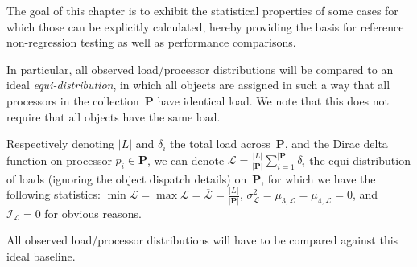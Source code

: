 The goal of this chapter is to exhibit the statistical properties of
some cases for which those can be explicitly calculated, hereby
providing the basis for reference non-regression testing as well as
performance comparisons.

In particular, all observed load/processor distributions will be
compared to an ideal \emph{equi-distribution}, in which all
objects are assigned in such a way that all processors in the
collection~$\mathbf{P}$ have identical load.
We note that this does not require that all objects have the same
load.

Respectively denoting $\vert{L}\vert$ and $\delta_i$ the total load
across~$\mathbf{P}$, and the Dirac delta function on processor
$p_i\in\mathbf{P}$, we can denote
$\mathcal{L}=\frac{\vert{L}\vert}{\vert{\mathbf{P}}\vert}
\sum_{i=1}^{\vert{\mathbf{P}}\vert}\delta_i$ the
equi-distribution of loads (ignoring the object dispatch details)
on~$\mathbf{P}$, for which we have  the following statistics:
$\min{\mathcal{L}} = \max{\mathcal{L}}
= \overline{\mathcal{L}} = \frac{\vert{L}\vert{}}{\vert{\mathbf{P}}\vert}$,
$\sigma_{\mathcal{L}}^2 = \mu_{3,\mathcal{L}} = \mu_{4,\mathcal{L}} = 0$,
and
$\mathcal{I}_{\mathcal{L}}= 0$
for obvious reasons.

All observed load/processor distributions will have to be compared
against this ideal baseline.

